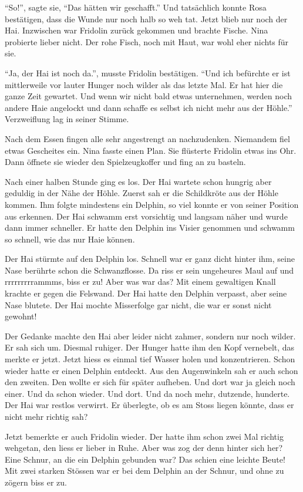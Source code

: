 \enquote{So!}, sagte sie, \enquote{Das hätten wir geschafft.} Und tatsächlich konnte Rosa bestätigen, dass die Wunde nur noch halb so weh tat. Jetzt blieb nur noch der Hai. Inzwischen war Fridolin zurück gekommen und brachte Fische. Nina probierte lieber nicht. Der rohe Fisch, noch mit Haut, war wohl eher nichts für sie.

\enquote{Ja, der Hai ist noch da.}, musste Fridolin bestätigen. \enquote{Und ich befürchte er ist mittlerweile vor lauter Hunger noch wilder als das letzte Mal. Er hat hier die ganze Zeit gewartet. Und wenn wir nicht bald etwas unternehmen, werden noch andere Haie angelockt und dann schaffe es selbst ich nicht mehr aus der Höhle.} Verzweiflung lag in seiner Stimme.

Nach dem Essen fingen alle sehr angestrengt an nachzudenken. Niemandem fiel etwas Gescheites ein. Nina fasste einen Plan. Sie flüsterte Fridolin etwas ins Ohr. Dann öffnete sie wieder den Spielzeugkoffer und fing an zu basteln. 

Nach einer halben Stunde ging es los. Der Hai wartete schon hungrig aber geduldig in der Nähe der Höhle. Zuerst sah er die Schildkröte aus der Höhle kommen. Ihm folgte mindestens ein Delphin, so viel konnte er von seiner Position aus erkennen. Der Hai schwamm erst vorsichtig und langsam näher und wurde dann immer schneller. Er hatte den Delphin ins Visier genommen und schwamm so schnell, wie das nur Haie können.

Der Hai stürmte auf den Delphin los. Schnell war er ganz dicht hinter ihm, seine Nase berührte schon die Schwanzflosse. Da riss er sein ungeheures Maul auf und rrrrrrrrrammms, biss er zu! Aber was war das? Mit einem gewaltigen Knall krachte er gegen die Felswand. Der Hai hatte den Delphin verpasst, aber seine Nase blutete. Der Hai mochte Misserfolge gar nicht, die war er sonst nicht gewohnt!

Der Gedanke machte den Hai aber leider nicht zahmer, sondern nur noch wilder. Er sah sich um. Diesmal ruhiger. Der Hunger hatte ihm den Kopf vernebelt, das merkte er jetzt. Jetzt hiess es einmal tief Wasser holen und konzentrieren. Schon wieder hatte er einen Delphin entdeckt. Aus den Augenwinkeln sah er auch schon den zweiten. Den wollte er sich für später aufheben. Und dort war ja gleich noch einer. Und da schon wieder. Und dort. Und da noch mehr, dutzende, hunderte. Der Hai war restlos verwirrt. Er überlegte, ob es am Stoss liegen könnte, dass er nicht mehr richtig sah?

Jetzt bemerkte er auch Fridolin wieder. Der hatte ihm schon zwei Mal richtig wehgetan, den liess er lieber in Ruhe. Aber was zog der denn hinter sich her? Eine Schnur, an die ein Delphin gebunden war? Das schien eine leichte Beute! Mit zwei starken Stössen war er bei dem Delphin an der Schnur, und ohne zu zögern biss er zu.

